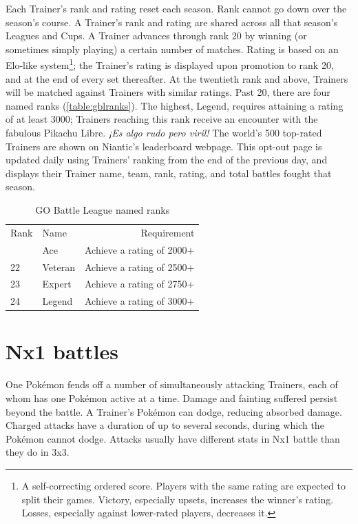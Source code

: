 Each Trainer's rank and rating reset each season.
Rank cannot go down over the season's course.
A Trainer's rank and rating are shared across all that season's Leagues and Cups.
A Trainer advances through rank 20 by winning (or sometimes simply playing) a certain number of matches.
Rating is based on an Elo-like system\footnote{A self-correcting ordered score.
Players with the same rating are expected to split their games.
Victory, especially upsets, increases the winner's rating.
Losses, especially against lower-rated players, decreases it.}; the Trainer's rating is displayed upon promotion to rank 20, and at the end of every set thereafter.
At the twentieth rank and above, Trainers will be matched against Trainers with similar ratings.
Past 20, there are four named ranks (\autoref{table:gblranks}).
The highest, Legend, requires attaining a rating of at least 3000;
 Trainers reaching this rank receive an encounter with the
 fabulous Pikachu Libre. \textit{¡Es algo rudo pero viril!}
The world's 500 top-rated Trainers are shown on Niantic's leaderboard webpage.
This opt-out page is updated daily using Trainers' ranking from the end of the previous day,
 and displays their Trainer name, team, rank, rating, and total battles fought that season.
\begin{table}
\begin{tabular}{llr}
Rank & Name & Requirement\\
\Midrule
  21 & Ace & Achieve a rating of 2000+\\
  22 & Veteran & Achieve a rating of 2500+\\
  23 & Expert & Achieve a rating of 2750+\\
  24 & Legend & Achieve a rating of 3000+\\
\end{tabular}
\caption{GO Battle League named ranks}
\label{table:gblranks}
\end{table}

\section{Nx1 battles}
\label{sec:nx1}
One Pokémon fends off a number of simultaneously attacking Trainers, each of whom has one Pokémon active at a time.
Damage and fainting suffered persist beyond the battle.
A Trainer's Pokémon can dodge, reducing absorbed damage.
Charged attacks have a duration of up to several seconds, during which the Pokémon cannot dodge.
Attacks usually have different stats in Nx1 battle than they do in 3x3.

